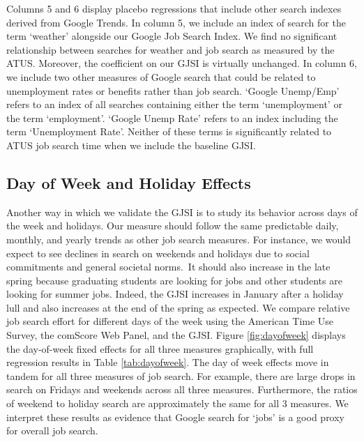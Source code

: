 \documentclass[12pt]{article}
\begin{document}
\begin{spacing}{2}
Columns 5 and 6 display placebo regressions that include other search indexes derived from Google Trends. In column 5, we include an index of search for the term `weather' alongside our Google Job Search Index. We find no significant relationship between searches for weather and job search as measured by the ATUS. Moreover, the coefficient on our GJSI is virtually unchanged. In column 6, we include two other measures of Google search that could be related to unemployment rates or benefits rather than job search. `Google Unemp/Emp' refers to an index of all searches containing either the term `unemployment' or the term `employment'. `Google Unemp Rate' refers to an index including the term `Unemployment Rate'. Neither of these terms is significantly related to ATUS job search time when we include the baseline GJSI.\footnotemark
{}


\subsection{Day of Week and Holiday Effects}\label{sec:dayofweek}
Another way in which we validate the GJSI is to study its behavior across days of the week and holidays. Our measure should follow the same predictable daily, monthly, and yearly trends as other job search measures. For instance, we would expect to see declines in search on weekends and holidays due to social commitments and general societal norms.\footnotemark \ It should also increase in the late spring because graduating students are looking for jobs and other students are looking for summer jobs. Indeed, the GJSI increases in January after a holiday lull and also increases at the end of the spring as expected. We compare relative job search effort for different days of the week using the American Time Use Survey, the comScore Web Panel, and the GJSI. Figure \ref{fig:dayofweek} displays the day-of-week fixed effects for all three measures graphically, with full regression results in Table \ref{tab:dayofweek}. The day of week effects move in tandem for all three measures of job search. For example, there are large drops in search on Fridays and weekends across all three measures. Furthermore, the ratios of weekend to holiday search are approximately the same for all 3 measures. We interpret these results as evidence that Google search for `jobs' is a good proxy for overall job search.


\end{spacing}
\end{document}
